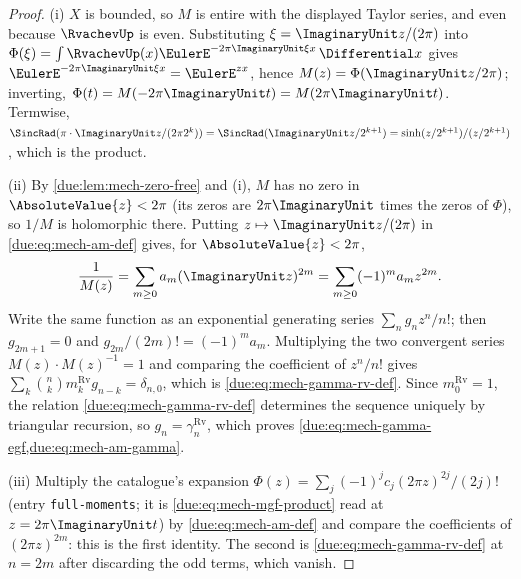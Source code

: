 \documentclass[11pt,oneside]{article}
\theoremstyle{plain}
\theoremstyle{definition}
\theoremstyle{remark}
\newcommand{\PhiUp}{\Phi}                                   %
\newcommand{\am}[1]{a_{#1}}                                 %
\begin{document}
\begin{proof}
(i) \(X\) is bounded, so \(M\) is entire with the displayed Taylor series,
and even because \(\RvachevUp\) is even.  Substituting
\(\xi=\ImaginaryUnit z/(2\pi)\) into
\(\PhiUp(\xi)=\int\RvachevUp(x)\EulerE^{-2\pi\ImaginaryUnit\xi x}\,\Differential x\)
gives \(\EulerE^{-2\pi\ImaginaryUnit\xi x}=\EulerE^{zx}\), hence
\(M(z)=\PhiUp(\ImaginaryUnit z/2\pi)\); inverting, \(\PhiUp(t)=M(-2\pi\ImaginaryUnit t)
=M(2\pi\ImaginaryUnit t)\).  Termwise,
\(\SincRad(\pi\cdot\ImaginaryUnit z/(2\pi2^{k}))=\SincRad(\ImaginaryUnit z/2^{k+1})
=\sinh(z/2^{k+1})/(z/2^{k+1})\), which is the product.

(ii) By \cref{due:lem:mech-zero-free} and (i), \(M\) has no zero in
\(\AbsoluteValue{z}<2\pi\) (its zeros are \(2\pi\ImaginaryUnit\) times the
zeros of \(\PhiUp\)), so \(1/M\) is holomorphic there.  Putting
\(z\mapsto\ImaginaryUnit z/(2\pi)\) in \cref{due:eq:mech-am-def} gives, for
\(\AbsoluteValue{z}<2\pi\),
\[
 \frac1{M(z)}=\sum_{m\ge0}\am{m}(\ImaginaryUnit z)^{2m}
 =\sum_{m\ge0}(-1)^{m}\am{m}z^{2m}.
\]
Write the same function as an exponential generating series
\(\sum_n g_nz^{n}/n!\); then \(g_{2m+1}=0\) and
\(g_{2m}/(2m)!=(-1)^m\am{m}\).  Multiplying the two convergent series
\(M(z)\cdot M(z)^{-1}=1\) and comparing the coefficient of \(z^{n}/n!\) gives
\(\sum_{k}\binom nk m_k^{\mathrm{Rv}}g_{n-k}=\delta_{n,0}\), which is
\cref{due:eq:mech-gamma-rv-def}.  Since \(m_0^{\mathrm{Rv}}=1\), the
relation \cref{due:eq:mech-gamma-rv-def} determines the sequence uniquely by
triangular recursion, so \(g_n=\gamma^{\mathrm{Rv}}_n\), which proves
\cref{due:eq:mech-gamma-egf,due:eq:mech-am-gamma}.

(iii) Multiply the catalogue's expansion
\(\PhiUp(z)=\sum_j(-1)^{j}c_j(2\pi z)^{2j}/(2j)!\) (entry
\texttt{full-moments}; it is \cref{due:eq:mech-mgf-product} read at
\(z=2\pi\ImaginaryUnit t\)) by \cref{due:eq:mech-am-def} and compare the
coefficients of \((2\pi z)^{2m}\): this is the first identity.  The second is
\cref{due:eq:mech-gamma-rv-def} at \(n=2m\) after discarding the odd terms,
which vanish.
\end{proof}
\end{document}
